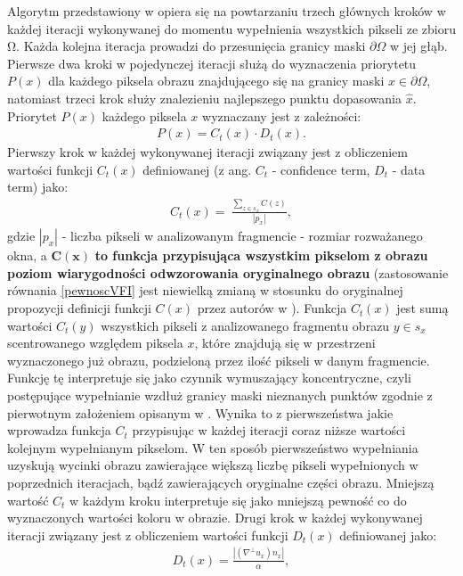 \documentclass[a4paper,12pt,twoside,openany]{report}
\begin{document}
Algorytm przedstawiony w \cite{criminisi2004region} opiera się na powtarzaniu trzech głównych kroków w każdej iteracji wykonywanej do momentu wypełnienia wszystkich pikseli ze zbioru $\mathrm{\Omega }$.
Każda kolejna iteracja prowadzi do przesunięcia granicy maski $\partial \Omega$ w jej głąb. Pierwsze dwa kroki w pojedynczej iteracji służą do wyznaczenia priorytetu $P\left(x\right)$ dla każdego piksela obrazu znajdującego się na granicy maski $x \in \partial \Omega$, natomiast trzeci krok służy znalezieniu najlepszego punktu dopasowania $\hat{x}$.
Priorytet $P \left( x \right)$ każdego piksela $x$ wyznaczany jest z zależności:
\begin{align}
P\left( x \right)=C_t(x)\cdot D_t(x).
\label{PRIORITY}
\end{align}
Pierwszy krok w każdej wykonywanej iteracji związany jest z obliczeniem wartości funkcji $C_t(x)$ definiowanej (z ang. $C_t$ - confidence term, $D_t$ - data term) jako:
\begin{align}
C_t\left( x \right)=\ \frac{\sum_{z \in s_x} {C(z)}}{\left|p_x\right|},
\label{confidenceTerm}
\end{align}
gdzie $\left| p_x\right |$ - liczba pikseli w analizowanym fragmencie - rozmiar rozważanego okna,
a $\mathbf{C(x)}$ \textbf{to funkcja przypisująca wszystkim pikselom z obrazu poziom wiarygodności odwzorowania oryginalnego obrazu}
(zastosowanie równania \eqref{pewnoscVFI} jest niewielką zmianą w stosunku do oryginalnej propozycji definicji funkcji $C(x)$ przez autorów w \cite{criminisi2004region}). Funkcja $C_t(x)$ jest sumą wartości $C_t(y)$ wszystkich pikseli z analizowanego fragmentu obrazu $y \in s_x$ scentrowanego względem piksela $x$, które znajdują się w przestrzeni wyznaczonego już obrazu, podzieloną przez ilość pikseli w danym fragmencie. Funkcję tę interpretuje się jako czynnik wymuszający koncentryczne, czyli postępujące wypełnianie wzdłuż granicy maski nieznanych punktów zgodnie z pierwotnym założeniem opisanym w \cite{efros1999texture}. Wynika to z pierwszeństwa jakie wprowadza funkcja $C_t$ przypisując w każdej iteracji coraz niższe wartości kolejnym wypełnianym pikselom. W ten sposób pierwszeństwo wypełniania uzyskują wycinki obrazu zawierające większą liczbę pikseli wypełnionych w poprzednich iteracjach, bądź zawierających oryginalne części obrazu. Mniejszą wartość $C_t$ w każdym kroku interpretuje się jako mniejszą pewność co do wyznaczonych wartości koloru w obrazie.
Drugi krok w każdej wykonywanej iteracji związany jest z obliczeniem wartości funkcji $D_t(x)$ definiowanej jako:
\begin{align}
D_t(x)= \frac{\left|\left( \nabla^{\bot}u_x \right) n_x\right|}{\alpha },
\label{DataTerm}
\end{align}
\end{document}

